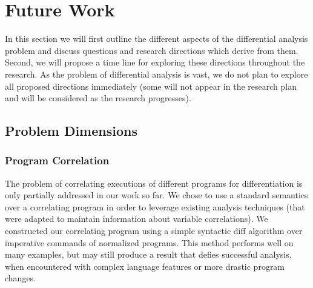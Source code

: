 \section{Future Work}

In this section we will first outline the different aspects of the differential analysis problem and discuss questions and research directions which derive from them. Second, we will propose a time line for exploring these directions throughout the research. As the problem of differential analysis is vast, we do not plan to explore all proposed directions immediately (some will not appear in the research plan and will be considered as the research progresses).

\subsection{Problem Dimensions}

\subsubsection{Program Correlation}

The problem of correlating executions of different programs for differentiation is only partially addressed in our work so far. We chose to use a standard semantics over a correlating program in order to leverage existing analysis techniques (that were adapted to maintain information about variable correlations). We constructed our correlating program using a simple syntactic diff algorithm over imperative commands of normalized programs. This method performs well on many examples, but may still produce a result that defies successful analysis, when encountered with complex language features or more drastic program changes.
